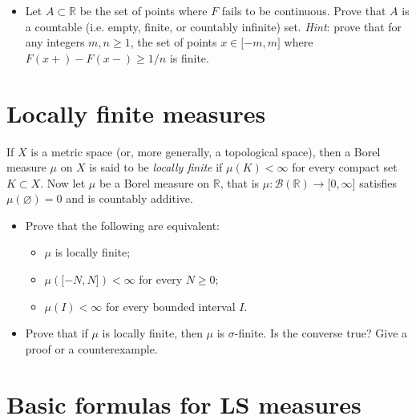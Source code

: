 \documentclass{qlnotes-export}
\begin{document}
\begin{itemize}
  \begin{itemize}
  \item
    \(F\) is surjective;
  \item
    \(F\) is continuous, \(F(\infty) = \infty\), and \(F( - \infty) = - \infty\).
  \end{itemize}
\item
  Let \(A \subset {\mathbb{R}}\) be the set of points where \(F\) fails to be continuous. Prove that \(A\) is a countable (i.e. empty, finite, or countably infinite) set. \emph{Hint}: prove that for any integers \(m,n \geq 1\), the set of points \(x \in \lbrack - m,m\rbrack\) where \(F(x + ) - F(x - ) \geq 1/n\) is finite.
\end{itemize}

\section{Locally finite measures}\label{locally-finite-measures}

If \(X\) is a metric space (or, more generally, a topological space), then a Borel measure \(\mu\) on \(X\) is said to be \emph{locally finite} if \(\mu(K) < \infty\) for every compact set \(K \subset X\). Now let \(\mu\) be a Borel measure on \(\mathbb{R}\), that is \(\mu:\mathcal{B}({\mathbb{R}})\rightarrow\lbrack 0,\infty\rbrack\) satisfies \(\mu(\varnothing) = 0\) and is countably additive.

\begin{itemize}
\item
  Prove that the following are equivalent:

  \begin{itemize}
  \item
    \(\mu\) is locally finite;
  \item
    \(\mu(\lbrack - N,N\rbrack) < \infty\) for every \(N \geq 0\);
  \item
    \(\mu(I) < \infty\) for every bounded interval \(I\).
  \end{itemize}
\item
  Prove that if \(\mu\) is locally finite, then \(\mu\) is \(\sigma\)-finite. Is the converse true? Give a proof or a counterexample.
\end{itemize}

\section{Basic formulas for LS measures}\label{basic-formulas-for-ls-measures}
\end{document}
